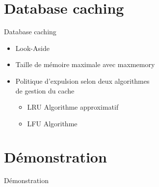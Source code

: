 \documentclass[aspectratio=169]{beamer}
\begin{document}
\section{Database caching}
\begin{frame}{Database caching}
\begin{itemize}
  \item Look-Aside 
  \item Taille de mémoire maximale avec maxmemory
  \item Politique d'expulsion selon deux algorithmes \\ de gestion du cache
  \begin{itemize}
    \item LRU Algorithme approximatif
    \item LFU Algorithme
 \end{itemize}
\end{itemize}
\end{frame}

\section{Démonstration}
\begin{frame}{Démonstration}

\end{frame}
\end{document}
